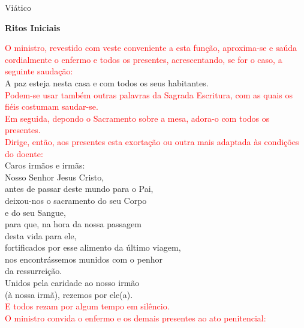 \documentclass{book}
\begin{document}
\pagestyle{empty}
\begin{center}
    \large Viático
\end{center}
\begin{center}
    \textbf{Ritos Iniciais}
\end{center}
\begin{flushleft}
    \textcolor{red}{O ministro, revestido com veste conveniente a esta função, aproxima-se e saúda cordialmente o enfermo e todos os presentes, acrescentando, se for o caso, a seguinte saudação:}
    \vspace{.1cm} \\
    A paz esteja nesta casa e com todos os seus habitantes.
    \vspace{.1cm} \\
    \textcolor{red}{Podem-se usar também outras palavras da Sagrada Escritura, com as quais os fiéis costumam saudar-se. \\ Em seguida, depondo o Sacramento sobre a mesa, adora-o com todos os presentes.}
    \vspace{.1cm} \\
    \textcolor{red}{Dirige, então, aos presentes esta exortação ou outra mais adaptada às condições do doente:}
    \vspace{.1cm} \\
    Caros irmãos e irmãs: \\
    Nosso Senhor Jesus Cristo, \\
    antes de passar deste mundo para o Pai, \\
    deixou-nos o sacramento do seu Corpo \\
    e do seu Sangue, \\
    para que, na hora da nossa passagem \\
    desta vida para ele, \\
    fortificados por esse alimento da último viagem, \\
    nos encontrássemos munidos com o penhor \\
    da ressurreição. \\
    Unidos pela caridade ao nosso irmão \\
    (à nossa irmã), rezemos por ele(a).
    \vspace{.1cm} \\
    \textcolor{red}{E todos rezam por algum tempo em silêncio.}
    \vspace{.1cm} \\
    \textcolor{red}{O ministro convida o enfermo e os demais presentes ao ato penitencial:}

\end{flushleft}
\end{document}
